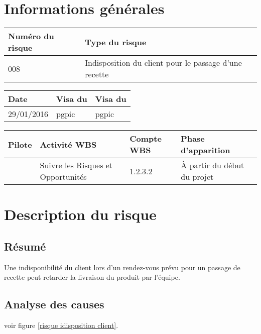 \section*{Informations générales}
 
\begin{table}[H]
\centering
	\begin{tabularx}{16.8cm}{|X|X|}
	\hline
	\rowcolor{gray!40} Numéro du risque & Type du risque \\
	\hline
	008 & Indisposition du client pour le passage d'une recette \\
	\hline
	\end{tabularx}
\end{table}

\begin{table}[H]
\centering
	\begin{tabularx}{16.8cm}{|X|X|X|}
	\hline
	\rowcolor{gray!40} Date & Visa du \RQ & Visa du \CP \\
	\hline
	 29/01/2016 & pgpic & pgpic \\
	\hline
	\end{tabularx}
\end{table}

\begin{table}[H]
\centering
	\begin{tabularx}{16.8cm}{|X|X|X|X|}
	\hline
	\rowcolor{gray!40} Pilote & Activité WBS & Compte WBS & Phase d'apparition \\
	\hline
	 \Julie & Suivre les Risques et Opportunités & 1.2.3.2 & À partir du début du projet\\
	\hline
	\end{tabularx}
\end{table}

\section*{Description du risque}

\subsection*{Résumé}
	Une indisponibilité du client lors d'un rendez-vous prévu pour un passage de recette peut retarder la livraison du produit par l'équipe. 
	
\subsection*{Analyse des causes}
	voir figure \ref{risque idisposition client}.


